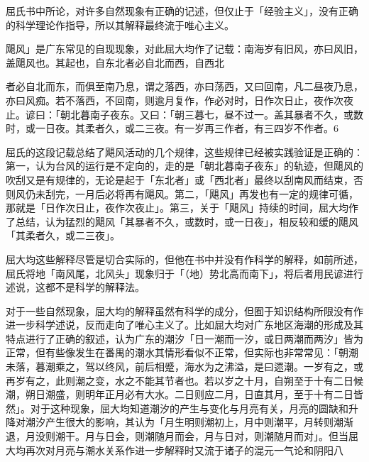 屈氏书中所论，对许多自然现象有正确的记述，但仅止于「经验主义」，没有正确的科学理论作指导，所以其解释最终流于唯心主义。

\begin{BookQuote}
飓风」是广东常见的自现现象，对此屈大均作了记载：南海岁有旧风，亦曰风旧，盖飓风也。其起也，自东北者必自北而西，自西北
\end{BookQuote}

\vfill
\begin{BookNotes}
\end{BookNotes}

\begin{BookQuote}
者必自北而东，而俱至南乃息，谓之落西，亦曰荡西，又曰回南，凡二昼夜乃息，亦曰风痴。若不落西，不回南，则逾月复作，作必对时，日作次日止，夜作次夜止。谚曰：「朝北暮南子夜东。又曰：「朝三暮七，昼不过一。盖其暴者不久，或数时，或一日夜。其柔者久，或二三夜。有一岁再三作者，有三四岁不作者。6
\end{BookQuote}

屈氏的这段记载总结了飓风活动的几个规律，这些规律已经被实践验证是正确的：第一，认为台风的运行是不定向的，走的是「朝北暮南子夜东」的轨迹，但飓风的吹刮又是有规律的，无论是起于「东北者」或「西北者」最终以刮南风而结束，否则风仍未刮完，一月后必将再有飓风。第二，「飓风」再发也有一定的规律可循，那就是「日作次日止，夜作次夜止」。第三，关于「飓风」持续的时间，屈大均作了总结，认为猛烈的飓风「其暴者不久，或数时，或一日夜」，相反较和缓的飓风「其柔者久，或二三夜」。

屈大均这些解释尽管是切合实际的，但他在书中并没有作科学的解释，如前所述，屈氏将地「南风尾，北风头」现象归于「（地）势北高而南下」，将后者用民谚进行述说，这都不是科学的解释法。

对于一些自然现象，屈大均的解释虽然有科学的成分，但囿于知识结构所限没有作进一步科学述说，反而走向了唯心主义了。比如屈大均对广东地区海潮的形成及其特点进行了正确的叙述，认为广东的潮汐「日一潮而一汐，或日两潮而两汐」皆为正常，但有些像发生在番禺的潮水其情形看似不正常，但实际也非常常见：「朝潮未落，暮潮乘之，驾以终风，前后相蹙，海水为之沸溢，是曰遝潮。一岁有之，或再岁有之，此则潮之变，水之不能其节者也。若以岁之十月，自朔至于十有二日候潮，朔日潮盛，则明年正月必有大水。二日则应二月，日直其月，至于十有二日皆然」。对于这种现象，屈大均知道潮汐的产生与变化与月亮有关，月亮的圆缺和升降对潮汐产生很大的影响，其认为「月生明则潮初上，月中则潮平，月转则潮渐退，月没则潮干。月与日会，则潮随月而会，月与日对，则潮随月而对」。但当屈大均再次对月亮与潮水关系作进一步解释时又流于诸子的混元一气论和阴阳八

